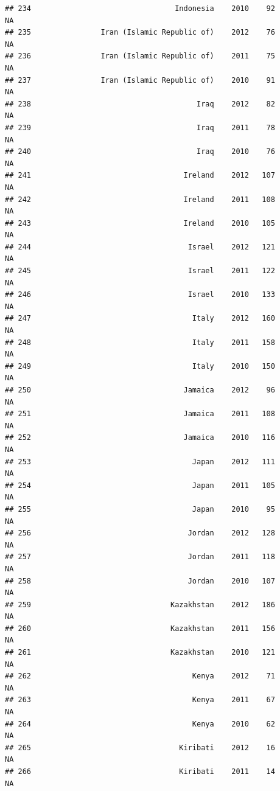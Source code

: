 \documentclass[
]{book}
\begin{document}
\begin{verbatim}
## 234                                 Indonesia    2010    92              NA
## 235                Iran (Islamic Republic of)    2012    76              NA
## 236                Iran (Islamic Republic of)    2011    75              NA
## 237                Iran (Islamic Republic of)    2010    91              NA
## 238                                      Iraq    2012    82              NA
## 239                                      Iraq    2011    78              NA
## 240                                      Iraq    2010    76              NA
## 241                                   Ireland    2012   107              NA
## 242                                   Ireland    2011   108              NA
## 243                                   Ireland    2010   105              NA
## 244                                    Israel    2012   121              NA
## 245                                    Israel    2011   122              NA
## 246                                    Israel    2010   133              NA
## 247                                     Italy    2012   160              NA
## 248                                     Italy    2011   158              NA
## 249                                     Italy    2010   150              NA
## 250                                   Jamaica    2012    96              NA
## 251                                   Jamaica    2011   108              NA
## 252                                   Jamaica    2010   116              NA
## 253                                     Japan    2012   111              NA
## 254                                     Japan    2011   105              NA
## 255                                     Japan    2010    95              NA
## 256                                    Jordan    2012   128              NA
## 257                                    Jordan    2011   118              NA
## 258                                    Jordan    2010   107              NA
## 259                                Kazakhstan    2012   186              NA
## 260                                Kazakhstan    2011   156              NA
## 261                                Kazakhstan    2010   121              NA
## 262                                     Kenya    2012    71              NA
## 263                                     Kenya    2011    67              NA
## 264                                     Kenya    2010    62              NA
## 265                                  Kiribati    2012    16              NA
## 266                                  Kiribati    2011    14              NA

\end{verbatim}
\end{document}
